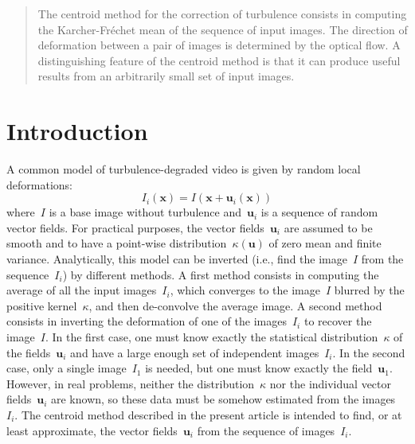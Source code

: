 \documentclass{ipol}
\def\x{\mathbf{x}}
\def\u{\mathbf{u}}
\begin{document}
\begin{abstract}
	The centroid method for the correction of turbulence consists in computing
	the Karcher-Fréchet mean of the sequence of input images.  The direction of
	deformation between a pair of images is determined by the optical flow.
	A distinguishing feature of the centroid method is that it can produce
	useful results from an arbitrarily small set of input images.
\end{abstract}

%
%
%
%

\section{Introduction}

A common model of turbulence-degraded video is given by random local
deformations:
\begin{equation}
	I_i(\x)=I(\x+\u_i(\x))
\end{equation}
where~$I$ is a base image without turbulence and~$\u_i$ is a sequence of
random vector fields.  For practical purposes, the vector fields~$\u_i$ are
assumed to be smooth and to have a point-wise distribution~$\kappa(\u)$ of
zero mean and finite variance.  Analytically, this model can be inverted
(i.e., find the image~$I$ from the sequence~$I_i$) by different methods.
A first 
method consists in %
computing the average of all the
input images~$I_i$, which converges to the image~$I$ blurred by the positive
kernel~$\kappa$, and then de-convolve the average image.  
A second method consists in inverting the deformation of one of the images~$I_i$ to
recover the image~$I$.  In the first case, one must know exactly the
statistical distribution~$\kappa$ of the fields~$\u_i$ and have a large enough
set of independent images~$I_i$.  In the second case, only a single
image~$I_1$ is needed, but one must know exactly the field~$\u_1$.  
However, in real
problems, neither the distribution~$\kappa$ nor the individual
vector fields~$\u_i$ %
are known, so these data must be somehow estimated from the images~$I_i$.  The
centroid method described in the present article is intended to find, or at
least approximate, the vector fields~$\u_i$ from the sequence of images~$I_i$.
\end{document}
